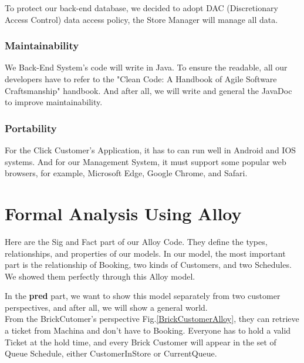 \documentclass[a4paper,12pt]{report}
\begin{document}
To protect our back-end database, we decided to adopt DAC (Discretionary Access Control) data access policy, the Store Manager will manage all data. \\

\subsection{Maintainability} 

We Back-End System's code will write in Java. To ensure the readable, all our developers have to refer to the "Clean Code: A Handbook of Agile Software Craftsmanship" handbook. And after all, we will write and general the JavaDoc to improve maintainability.

\subsection{Portability} 

For the Click Customer's Application, it has to can run well in Android and IOS systems. And for our Management System, it must support some popular web browsers, for example, Microsoft Edge, Google Chrome, and Safari. \\ 



\chapter{Formal Analysis Using Alloy}
Here are the Sig and Fact part of our Alloy Code. They define the types, relationships, and properties of our models. In our model, the most important part is the relationship of Booking, two kinds of Customers, and two Schedules. We showed them perfectly through this Alloy model. \\



\vspace{10mm}

In the \textbf{pred} part, we want to show this model separately from two customer perspectives, and after all, we will show a general world.\\

From the BrickCutomer's perspective Fig.\ref{BrickCustomerAlloy}, they can retrieve a ticket from Machina and don't have to Booking. Everyone has to hold a valid Ticket at the hold time, and every Brick Customer will appear in the set of Queue Schedule, either CustomerInStore or CurrentQueue.
\end{document}
